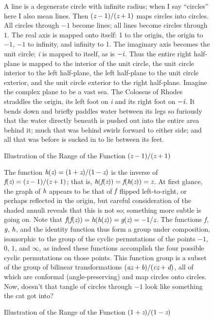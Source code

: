 \clearpage

\begin{figure}
\caption{Illustration of the Range of the Function $(\emph{z}-1)/(\emph{z}+1)$}
\small\noindent
A line is a degenerate circle with infinite radius;
when I say ``circles'' here I also mean lines.
Then $(\emph{z}-1)/(\emph{z}+1)$ maps circles into circles.
All circles through $-1$ become lines; all lines become
circles through $1$.
The real axis is mapped onto itself: 1 to
the origin, the origin to $-1$, $-1$ to infinity, and infinity to 1.
The imaginary axis becomes the unit circle; \emph{i} is mapped to itself,
as is $-\emph{i}$.  Thus the entire right half-plane is mapped to the interior
of the unit circle, the unit circle interior to the left half-plane,
the left half-plane to the unit circle exterior, and the unit circle exterior
to the right half-plane.  Imagine the complex plane to be a vast sea.
The Colossus of Rhodes straddles the origin, its left foot on \emph{i} and its right foot on $-\emph{i}$.
It bends down and briefly paddles water between its legs so furiously that the water
directly beneath is pushed out into the entire area behind it; much that was
behind swirls forward to either side; and all that was before is
sucked in to lie between its feet.
\end{figure}

\clearpage

\begin{figure}
\caption{Illustration of the Range of the Function $(1+\emph{z})/(1-\emph{z})$}
\small\noindent
The function $\emph{h}(\emph{z})=(1+\emph{z})/(1-\emph{z})$
is the inverse of $\emph{f}(\emph{z})=(\emph{z}-1)/(\emph{z}+1)$; that is,
$\emph{h}(\emph{f}(\emph{z}))=\emph{f}(\emph{h}(\emph{z}))=\emph{z}$. At first glance,
the graph of $\emph{h}$ appears to be that of $\emph{f}$
flipped left-to-right, or perhaps reflected in the origin, but careful
consideration of the shaded annuli reveals that this is not so; something more
subtle is going on.  Note that
$\emph{f}(\emph{f}(\emph{z}))=\emph{h}(\emph{h}(\emph{z}))=\emph{g}(\emph{z})=-1/\emph{z}$.
The functions $\emph{f}$, $\emph{g}$, $\emph{h}$, and the identity function
thus form a group under composition, isomorphic to the group
of the cyclic permutations of the points $-1$, $0$, $1$, and $\infty$, as
indeed these functions accomplish the four possible cyclic permutations
on those points.  This function group is a subset of the group of bilinear
transformations $(\emph{a}\emph{z}+\emph{b})/(\emph{c}\emph{z}+\emph{d})$,
all of which are conformal (angle-preserving) and map circles
onto circles.  Now, doesn't that tangle of circles through $-1$ look like something
the cat got into?
\end{figure}

